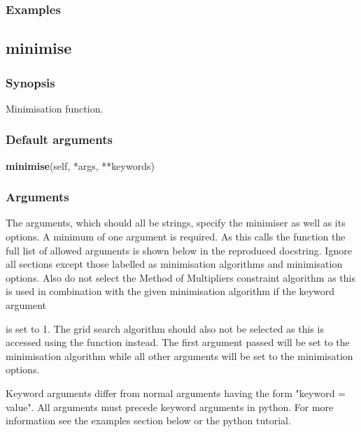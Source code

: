 \subsubsection{Examples}





\newpage

\subsection{minimise}


\subsubsection{Synopsis}

Minimisation function.

\subsubsection{Default arguments}

\textsf{\textbf{minimise}(self, *args, **keywords)}


\subsubsection{Arguments}

The arguments, which should all be strings, specify the minimiser as well as its options.  A
minimum of one argument is required.  As this calls the function 
 the full
list of allowed arguments is shown below in the reproduced 
 docstring.
Ignore all sections except those labelled as minimisation algorithms and minimisation
options.  Also do not select the Method of Multipliers constraint algorithm as this is used
in combination with the given minimisation algorithm if the keyword argument 

is set to 1.  The grid search algorithm should also not be selected as this is accessed
using the 
 function instead.  The first argument passed will be set to the
minimisation algorithm while all other arguments will be set to the minimisation options.

Keyword arguments differ from normal arguments having the form "keyword = value".  All
arguments must precede keyword arguments in python.  For more information see the examples
section below or the python tutorial.


